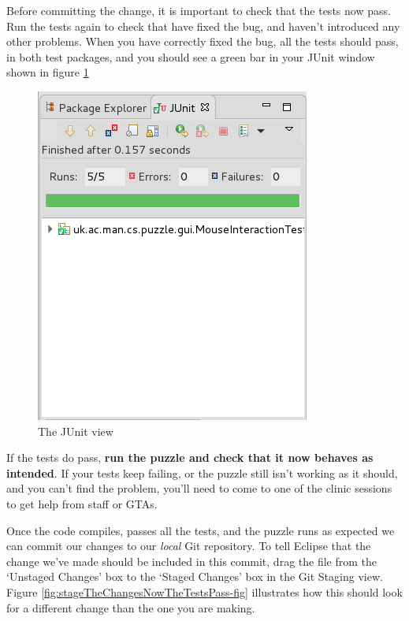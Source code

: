\documentclass[
]{book}
\begin{document}
Before committing the change, it is important to check that the tests now pass. Run the tests again to check that have fixed the bug, and haven't introduced any other problems. When you have correctly fixed the bug, all the tests should pass, in both test packages, and you should see a green bar in your JUnit window shown in figure \ref{fig:runTestsAfterMakingTheChangeAndAllPass-fig}

\begin{figure}

{\centering \includegraphics[width=0.5\linewidth]{images/runTestsAfterMakingTheChangeAndAllPass} 

}

\caption{The JUnit view}\label{fig:runTestsAfterMakingTheChangeAndAllPass-fig}
\end{figure}

If the tests do pass, \textbf{run the puzzle and check that it now behaves as intended}. If your tests keep failing, or the puzzle still isn't working as it should, and you can't find the problem, you'll need to come to one of the clinic sessions to get help from staff or GTAs.

Once the code compiles, passes all the tests, and the puzzle runs as expected we can commit our changes to our \emph{local} Git repository. To tell Eclipse that the change we've made should be included in this commit, drag the file from the `Unstaged Changes' box to the `Staged Changes' box in the Git Staging view. Figure \ref{fig:stageTheChangesNowTheTestsPass-fig} illustrates how this should look for a different change than the one you are making.
\end{document}
